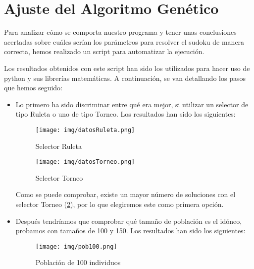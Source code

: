 \documentclass[a4,11pt]{article}
\begin{document}
\newpage

\section{Ajuste del Algoritmo Genético}\label{label}

Para analizar cómo se comporta nuestro programa y tener unas conclusiones acertadas sobre cuáles serían los parámetros para resolver el sudoku de manera correcta, hemos realizado un script para automatizar la ejecución.

Los resultados obtenidos con este script han sido los utilizados para hacer uso de python y sus librerías matemáticas. A continuación, se van detallando los pasos que hemos seguido:

\begin{itemize}

\item Lo primero ha sido discriminar entre qué era mejor, si utilizar un selector de tipo Ruleta o uno de tipo Torneo. Los resultados han sido los siguientes:


\begin{figure}[h]
\begin{center}
\texttt{[image: img/datosRuleta.png]}
\end{center}
\caption{Selector Ruleta}
\label{fig:ruleta}
\end{figure}


\begin{figure}[h]
\begin{center}
\texttt{[image: img/datosTorneo.png]}
\end{center}
\caption{Selector Torneo}
\label{fig:torneo}
\end{figure}

Como se puede comprobar, existe un mayor número de soluciones con el selector Torneo (\ref{fig:torneo}), por lo que elegiremos este como primera opción.

\item Después tendríamos que comprobar qué tamaño de población es el idóneo, probamos con tamaños de 100 y 150. Los resultados han sido los siguientes:

\begin{figure}[h]
\begin{center}
\texttt{[image: img/pob100.png]}
\end{center}
\caption{Población de 100 individuos}
\label{fig:pob100}
\end{figure}


\end{itemize}
\end{document}
